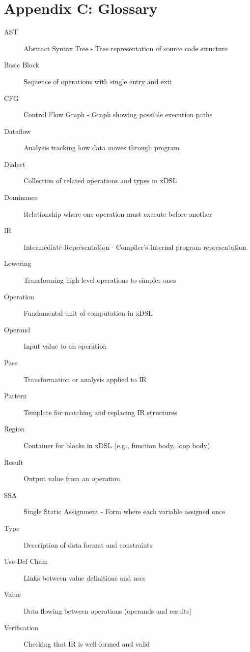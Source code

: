 \documentclass[11pt,a4paper]{article}
\begin{document}
\section{Appendix C: Glossary}

\begin{description}
    \item[AST] Abstract Syntax Tree - Tree representation of source code structure
    \item[Basic Block] Sequence of operations with single entry and exit
    \item[CFG] Control Flow Graph - Graph showing possible execution paths
    \item[Dataflow] Analysis tracking how data moves through program
    \item[Dialect] Collection of related operations and types in xDSL
    \item[Dominance] Relationship where one operation must execute before another
    \item[IR] Intermediate Representation - Compiler's internal program representation
    \item[Lowering] Transforming high-level operations to simpler ones
    \item[Operation] Fundamental unit of computation in xDSL
    \item[Operand] Input value to an operation
    \item[Pass] Transformation or analysis applied to IR
    \item[Pattern] Template for matching and replacing IR structures
    \item[Region] Container for blocks in xDSL (e.g., function body, loop body)
    \item[Result] Output value from an operation
    \item[SSA] Single Static Assignment - Form where each variable assigned once
    \item[Type] Description of data format and constraints
    \item[Use-Def Chain] Links between value definitions and uses
    \item[Value] Data flowing between operations (operands and results)
    \item[Verification] Checking that IR is well-formed and valid
\end{description}
\end{document}
